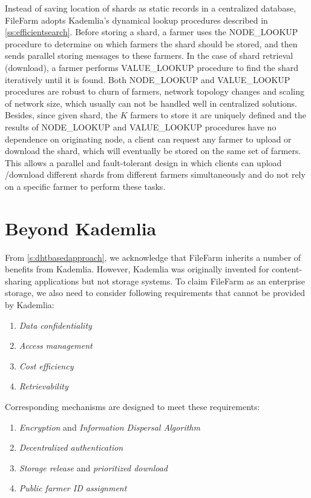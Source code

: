 Instead of saving location of shards as static records in a centralized database, FileFarm adopts Kademlia's dynamical lookup procedures described in \ref{ss:efficientsearch}. Before storing a shard, a farmer uses the NODE\_LOOKUP procedure to determine on which farmers the shard should be stored, and then sends parallel storing messages to these farmers. In the case of shard retrieval (download), a farmer performs VALUE\_LOOKUP procedure to find the shard iteratively until it is found. Both NODE\_LOOKUP and VALUE\_LOOKUP procedures are robust to churn of farmers, network topology changes and scaling of network size, which usually can not be handled well in centralized solutions. Besides, since given shard, the $K$ farmers to store it are uniquely defined and the results of NODE\_LOOKUP and VALUE\_LOOKUP procedures have no dependence on originating node, a client can request any farmer to upload or download the shard, which will eventually be stored on the same set of farmers. This allows a parallel and fault-tolerant design in which clients can upload /download different shards from different farmers simultaneously and do not rely on a specific farmer to perform these tasks.

\section{Beyond Kademlia}
\label{s:beyondkademlia}

From \ref{s:dhtbasedapproach}, we acknowledge that FileFarm inherits a number of benefits from Kademlia. However, Kademlia was originally invented for content-sharing applications but not storage systems. To claim FileFarm as an enterprise storage, we also need to consider following requirements that cannot be provided by Kademlia:

\begin{enumerate}
  \item \textit{Data confidentiality}
  \item \textit{Access management}
  \item \textit{Cost efficiency}
  \item \textit{Retrievability}
\end{enumerate}

\noindent Corresponding mechanisms are designed to meet these requirements:

\begin{enumerate}
  \item \textit{Encryption} and \textit{Information Dispersal Algorithm}
  \item \textit{Decentralized authentication}
  \item \textit{Storage release} and \textit{prioritized download}
  \item \textit{Public farmer ID assignment}
\end{enumerate}

